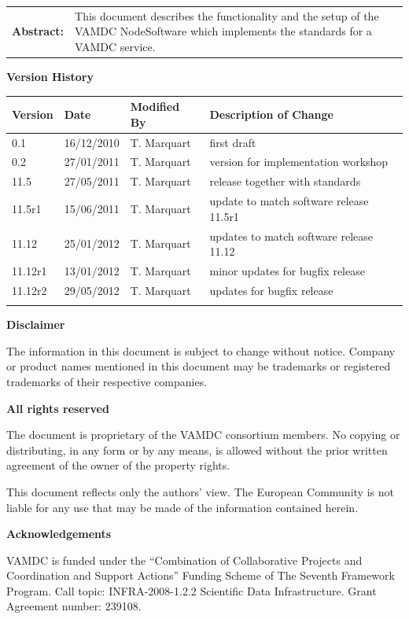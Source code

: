 {\begin{titlepage}
\begin{tabular}{p{1.7in}p{4.3in}}
\textbf{Abstract:} & 
This document describes the functionality and the setup of the VAMDC NodeSoftware which implements the standards for a VAMDC service.
\end{tabular}



\end{titlepage}

\noindent \textbf{Version History}

\textbf{}

\noindent \begin{tabular}{|l|l|l|l|} 
\hline 
\textbf{Version} & \textbf{Date} & \textbf{Modified By} & \textbf{Description of Change} \\ \hline 
0.1 & 16/12/2010 & T. Marquart & first draft \\ \hline 
0.2 & 27/01/2011 & T. Marquart & version for implementation workshop \\ \hline 
11.5 & 27/05/2011 & T. Marquart & release together with standards \\ \hline 
11.5r1 & 15/06/2011 & T. Marquart & update to match software release 11.5r1 \\ \hline 
11.12 & 25/01/2012 & T. Marquart & updates to match software release 11.12 \\ \hline 
11.12r1 & 13/01/2012 & T. Marquart & minor updates for bugfix release \\ \hline 
11.12r2 & 29/05/2012 & T. Marquart & updates for bugfix release \\ \hline 
 &  &  &  \\ \hline 
\end{tabular}

\textbf{}

\noindent \textbf{Disclaimer}

\noindent The information in this document is subject to change without notice. Company or product names mentioned in this document may be trademarks or registered trademarks of their respective companies.


\textbf{}

\noindent \textbf{All rights reserved}

\noindent The document is proprietary of the VAMDC consortium members. No copying or distributing, in any form or by any means, is allowed without the prior written agreement of the owner of the property rights.

\noindent 

\noindent This document reflects only the authors' view. The European Community is not liable for any use that may be made of the information contained herein.

\textbf{}

\noindent \textbf{Acknowledgements}

\noindent VAMDC is funded under the ``Combination of Collaborative Projects and Coordination and  Support Actions'' Funding Scheme of The Seventh Framework Program. Call topic: INFRA-2008-1.2.2 Scientific Data Infrastructure. Grant Agreement number: 239108.

\textbf{}

}

